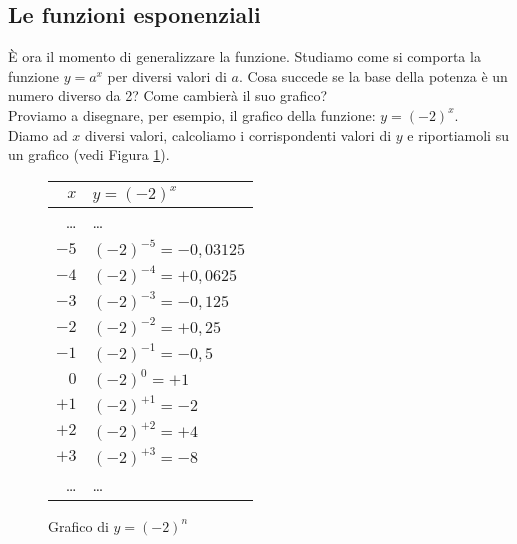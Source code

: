 \subsection{Le funzioni esponenziali}
\label{subsec:esplog_fesponenziale}

È ora il momento di generalizzare la funzione. 
Studiamo come si comporta la funzione \(y=a^x\) per diversi valori di \(a\).
Cosa succede se la base della potenza è un numero diverso da 2? 
Come cambierà il suo grafico?\\[10pt]
\; Proviamo a disegnare, per esempio, il grafico della 
funzione: \(y=(-2)^x\).\\[4pt]
Diamo ad \(x\) diversi valori, calcoliamo i corrispondenti valori di \(y\) 
e 
riportiamoli su un grafico (vedi Figura \ref{fig:potmenodue0}).
\begin{figure}[h]
 \centering
 \begin{minipage}[]{.48\textwidth}
 \vspace*{.6cm}
  \begin{center}
   \begin{tabular}{r|l}
    \(x\)   & \(y=(-2)^x\) \\
    \hline
    \dots & \dots \\
    \(-5\) & \((-2)^{-5} = -0,03125\) \\
    \(-4\) & \((-2)^{-4} = +0,0625\) \\
    \(-3\) & \((-2)^{-3} = -0,125\) \\
    \(-2\) & \((-2)^{-2} = +0,25\) \\
    \(-1\) & \((-2)^{-1} = -0,5\) \\
    \(0\) & \((-2)^{0} = +1\) \\
    \(+1\) & \((-2)^{+1} = -2\) \\
    \(+2\) & \((-2)^{+2} = +4\) \\
    \(+3\) & \((-2)^{+3} = -8\) \\
    \dots & \dots \\
   \end{tabular}
 \vspace*{.6cm} \label{tab:potmenodue0}
  \end{center}
 \end{minipage}
\begin{minipage}[]{.48\textwidth}
\begin{center}
\begin{inaccessibleblock}
  \puntimenodue
  \caption{Grafico di \(y=(-2)^n\)} \label{fig:potmenodue0}
\end{inaccessibleblock}
\end{center}
\end{minipage}
\end{figure}
